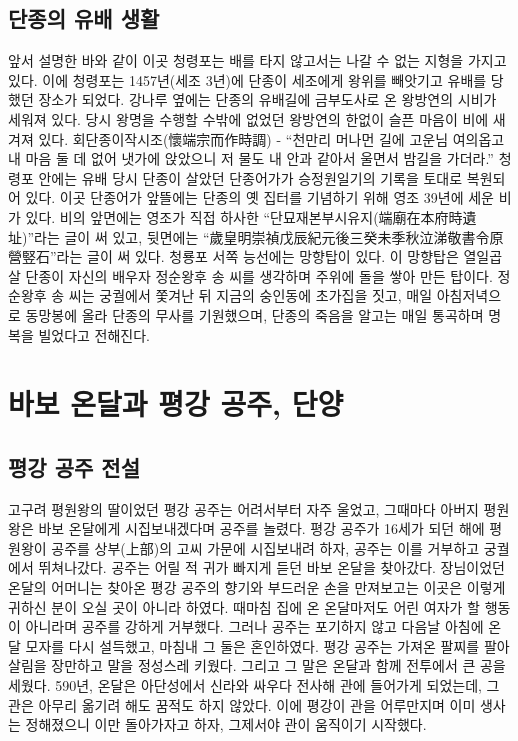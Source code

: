 \subsection{단종의 유배 생활}
앞서 설명한 바와 같이 이곳 청령포는 배를 타지 않고서는 나갈 수 없는 지형을 가지고 있다. 
이에 청령포는 1457년(세조 3년)에 단종이 세조에게 왕위를 빼앗기고 유배를 당했던 장소가 되었다. 
강나루 옆에는 단종의 유배길에 금부도사로 온 왕방연의 시비가 세워져 있다. 
당시 왕명을 수행할 수밖에 없었던 왕방연의 한없이 슬픈 마음이 비에 새겨져 있다. 
회단종이작시조(懷端宗而作時調) - ``천만리 머나먼 길에 고운님 여의옵고 내 마음 둘 데 없어 냇가에 앉았으니 저 물도 내 안과 같아서 울면서 밤길을 가더라.''
청령포 안에는 유배 당시 단종이 살았던 단종어가가 승정원일기의 기록을 토대로 복원되어 있다. 
이곳 단종어가 앞뜰에는 단종의 옛 집터를 기념하기 위해 영조 39년에 세운 비가 있다. 
비의 앞면에는 영조가 직접 하사한 ``단묘재본부시유지(端廟在本府時遺址)''라는 글이 써 있고, 
뒷면에는 ``歲皇明崇禎戊辰紀元後三癸未季秋泣涕敬書令原營竪石''라는 글이 써 있다. 
청룡포 서쪽 능선에는 망향탑이 있다. 이 망향탑은 열일곱 살 단종이 자신의 배우자 정순왕후 송 씨를 생각하며 주위에 돌을 쌓아 만든 탑이다. 
정순왕후 송 씨는 궁궐에서 쫓겨난 뒤 지금의 숭인동에 초가집을 짓고, 매일 아침저녁으로 동망봉에 올라 단종의 무사를 기원했으며, 
단종의 죽음을 알고는 매일 통곡하며 명복을 빌었다고 전해진다. 
\section{바보 온달과 평강 공주, 단양}
\subsection{평강 공주 전설}
고구려 평원왕의 딸이었던 평강 공주는 어려서부터 자주 울었고, 그때마다 아버지 평원왕은 바보 온달에게 시집보내겠다며 공주를 놀렸다. 
평강 공주가 16세가 되던 해에 평원왕이 공주를 상부(上部)의 고씨 가문에 시집보내려 하자, 
공주는 이를 거부하고 궁궐에서 뛰쳐나갔다. 공주는 어릴 적 귀가 빠지게 듣던 바보 온달을 찾아갔다. 
장님이었던 온달의 어머니는 찾아온 평강 공주의 향기와 부드러운 손을 만져보고는 이곳은 이렇게 귀하신 분이 오실 곳이 아니라 하였다. 
때마침 집에 온 온달마저도 어린 여자가 할 행동이 아니라며 공주를 강하게 거부했다. 
그러나 공주는 포기하지 않고 다음날 아침에 온달 모자를 다시 설득했고, 마침내 그 둘은 혼인하였다. 
평강 공주는 가져온 팔찌를 팔아 살림을 장만하고 말을 정성스레 키웠다. 그리고 그 말은 온달과 함께 전투에서 큰 공을 세웠다. 
590년, 온달은 아단성에서 신라와 싸우다 전사해 관에 들어가게 되었는데, 
그 관은 아무리 옮기려 해도 꿈적도 하지 않았다. 
이에 평강이 관을 어루만지며 이미 생사는 정해졌으니 이만 돌아가자고 하자, 그제서야 관이 움직이기 시작했다. 


